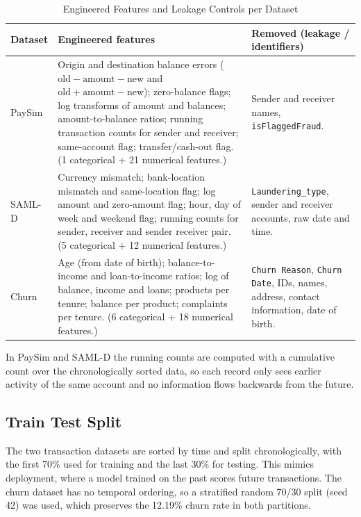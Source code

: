 \documentclass[10pt,twocolumn,a4paper]{article}
\begin{document}
\begin{table}[t]
\centering
\caption{Engineered Features and Leakage Controls per Dataset}
\label{tab:features}
\footnotesize
\setlength{\tabcolsep}{4pt}
\begin{tabular}{@{}>{\raggedright\arraybackslash}p{}>{\raggedright\arraybackslash}p{}>{\raggedright\arraybackslash}p{}@{}}
\toprule
\textbf{Dataset} & \textbf{Engineered features} & \textbf{Removed (leakage / identifiers)}\\
\midrule
PaySim &
Origin and destination balance errors ($\text{old}-\text{amount}-\text{new}$ and $\text{old}+\text{amount}-\text{new}$); zero-balance flags; log transforms of amount and balances; amount-to-balance ratios; running transaction counts for sender and receiver; same-account flag; transfer/cash-out flag. (1 categorical + 21 numerical features.) &
Sender and receiver names, \texttt{isFlaggedFraud}.\\
\addlinespace
SAML-D &
Currency mismatch; bank-location mismatch and same-location flag; log amount and zero-amount flag; hour, day of week and weekend flag; running counts for sender, receiver and sender receiver pair. (5 categorical + 12 numerical features.) &
\texttt{Laundering\_type}, sender and receiver accounts, raw date and time.\\
\addlinespace
Churn &
Age (from date of birth); balance-to-income and loan-to-income ratios; log of balance, income and loans; products per tenure; balance per product; complaints per tenure. (6 categorical + 18 numerical features.) &
\texttt{Churn Reason}, \texttt{Churn Date}, IDs, names, address, contact information, date of birth.\\
\bottomrule
\end{tabular}
\end{table}

In PaySim and SAML-D the running counts are computed with a cumulative count over the chronologically sorted data, so each record only sees earlier activity of the same account and no information flows backwards from the future.

\subsection{Train Test Split}
The two transaction datasets are sorted by time and split chronologically, with the first 70\% used for training and the last 30\% for testing. This mimics deployment, where a model trained on the past scores future transactions. The churn dataset has no temporal ordering, so a stratified random 70/30 split (seed 42) was used, which preserves the 12.19\% churn rate in both partitions.
\end{document}
